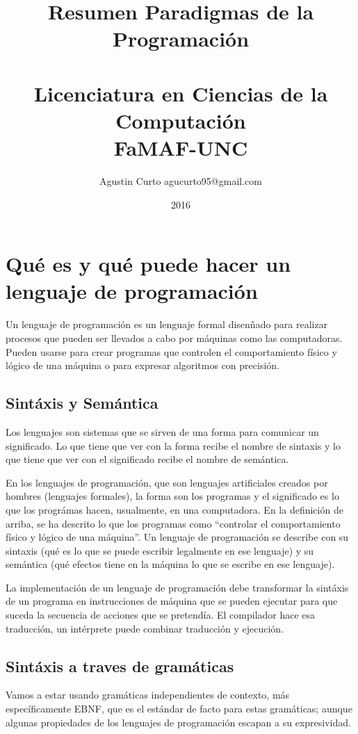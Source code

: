 \documentclass[10pt,a4paper]{report}
\title{Resumen Paradigmas de la Programación\\~\\Licenciatura en Ciencias de la 
Computación\\FaMAF-UNC}
\author{Agustin Curto     agucurto95@gmail.com}
\date{2016}
\begin{document}
\tableofcontents

\chapter{Qué es y qué puede hacer un lenguaje de programación}

Un lenguaje de programación es un lenguaje formal disenñado para realizar 
procesos que pueden ser llevados a cabo por máquinas como las 
computadoras. Pueden usarse para crear programas que controlen el 
comportamiento físico y lógico de una máquina o para expresar algoritmos 
con precisión.

\section{Sintáxis y Semántica}

\par Los lenguajes son sistemas que se sirven de una forma para comunicar 
un significado. Lo que tiene que ver con la forma recibe el nombre de 
sintaxis y lo que tiene que ver con el significado recibe el nombre de semántica.

\par En los lenguajes de programación, que son lenguajes artificiales 
creados por hombres (lenguajes formales), la forma son los programas y el 
significado es lo que los prográmas hacen, usualmente, en una 
computadora. En la definición de arriba, se ha descrito lo que los programas 
como “controlar el comportamiento físico y lógico de una máquina”.
Un lenguaje de programación se describe con su sintaxis (qué es lo que se 
puede escribir legalmente en ese lenguaje) y su semántica (qué efectos 
tiene en la máquina lo que se escribe en ese lenguaje).

\par La implementación de un lenguaje de programación debe transformar 
la sintáxis de un programa en instrucciones de máquina que se pueden 
ejecutar para que suceda la secuencia de acciones que se pretendía.
El compilador hace esa traducción, un intérprete puede combinar traducción 
y ejecución.


\section{ Sintáxis a traves de gramáticas}

\par Vamos a estar usando gramáticas independientes de contexto, más 
específicamente EBNF, que es el estándar de facto para estas gramáticas; 
aunque algunas propiedades de los lenguajes de programación escapan a su 
expresividad.
\end{document}
